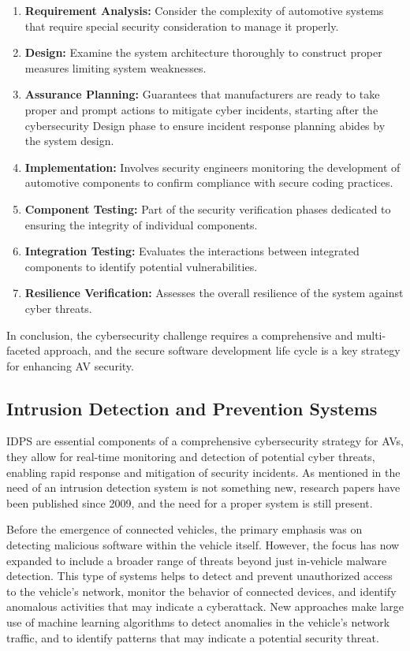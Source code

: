 \begin{enumerate}
    \item \textbf{Requirement Analysis:} Consider the complexity of automotive systems that require special security consideration to manage it properly.
    \item \textbf{Design:} Examine the system architecture thoroughly to construct proper measures limiting system weaknesses.
    \item \textbf{Assurance Planning:} Guarantees that manufacturers are ready to take proper and prompt actions to mitigate cyber incidents, starting after the cybersecurity Design phase to ensure incident response planning abides by the system design.
    \item \textbf{Implementation:} Involves security engineers monitoring the development of automotive components to confirm compliance with secure coding practices.
    \item \textbf{Component Testing:} Part of the security verification phases dedicated to ensuring the integrity of individual components.
    \item \textbf{Integration Testing:} Evaluates the interactions between integrated components to identify potential vulnerabilities.
    \item \textbf{Resilience Verification:} Assesses the overall resilience of the system against cyber threats.
\end{enumerate}

In conclusion, the cybersecurity challenge requires a comprehensive and multi-faceted approach, and the secure software development life cycle is a key strategy for enhancing AV security.

\subsection{Intrusion Detection and Prevention Systems}\label{subsec:intrusion-detection-and-prevention-systems}
IDPS are essential components of a comprehensive cybersecurity strategy for AVs, they allow for real-time monitoring and detection of potential cyber threats, enabling rapid response and mitigation of security incidents.
As mentioned in\cite{kim2020cybersecurity} the need of an intrusion detection system is not something new, research papers have been published since 2009, and the need for a proper system is still present.

Before the emergence of connected vehicles, the primary emphasis was on detecting malicious software within the vehicle itself.
However, the focus has now expanded to include a broader range of threats beyond just in-vehicle malware detection.
This type of systems helps to detect and prevent unauthorized access to the vehicle's network, monitor the behavior of connected devices, and identify anomalous activities that may indicate a cyberattack.
New approaches make large use of machine learning algorithms to detect anomalies in the vehicle's network traffic, and to identify patterns that may indicate a potential security threat\cite{nagarajan2023machine}.

